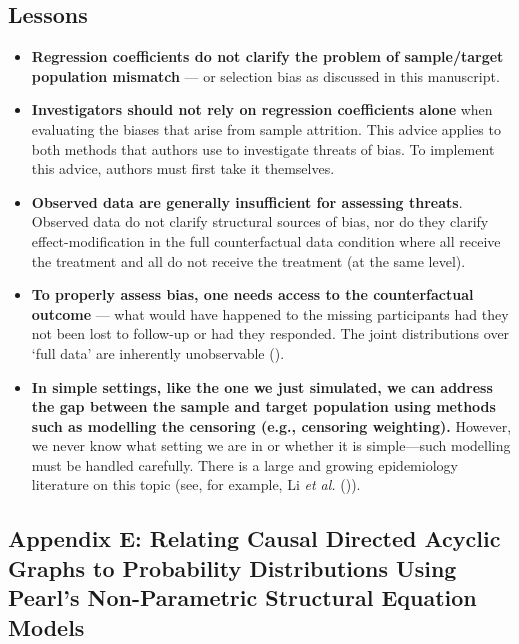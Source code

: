 \documentclass[
  single column]{article}
\providecommand{\tightlist}{%
  \setlength{\itemsep}{0pt}\setlength{\parskip}{0pt}}\usepackage{longtable,booktabs,array}
\begin{document}
\subsection{Lessons}\label{lessons}

\begin{itemize}
\tightlist
\item
  \textbf{Regression coefficients do not clarify the problem of
  sample/target population mismatch} --- or selection bias as discussed
  in this manuscript.
\item
  \textbf{Investigators should not rely on regression coefficients
  alone} when evaluating the biases that arise from sample attrition.
  This advice applies to both methods that authors use to investigate
  threats of bias. To implement this advice, authors must first take it
  themselves.
\item
  \textbf{Observed data are generally insufficient for assessing
  threats}. Observed data do not clarify structural sources of bias, nor
  do they clarify effect-modification in the full counterfactual data
  condition where all receive the treatment and all do not receive the
  treatment (at the same level).
\item
  \textbf{To properly assess bias, one needs access to the
  counterfactual outcome} --- what would have happened to the missing
  participants had they not been lost to follow-up or had they
  responded. The joint distributions over `full data' are inherently
  unobservable ().
\item
  \textbf{In simple settings, like the one we just simulated, we can
  address the gap between the sample and target population using methods
  such as modelling the censoring (e.g., censoring weighting).} However,
  we never know what setting we are in or whether it is simple---such
  modelling must be handled carefully. There is a large and growing
  epidemiology literature on this topic (see, for example, Li \emph{et
  al.} ()).
\end{itemize}

\newpage{}

\subsection{Appendix E: Relating Causal Directed Acyclic Graphs to
Probability Distributions Using Pearl's Non-Parametric Structural
Equation Models}\label{id-app-E}
\end{document}
